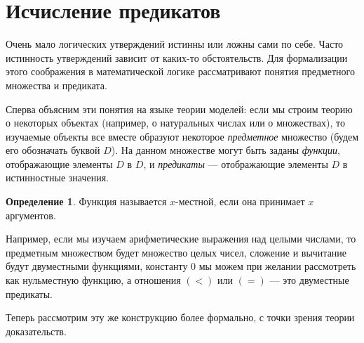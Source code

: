 \documentclass[12pt,a4paper,oneside]{article}
\begin{document}
\theoremstyle{definition}
\newtheorem{definition}{Определение}[section]
\newtheorem*{note}{Примечание}
\newtheorem*{example}{Пример}

\section{Исчисление предикатов}

Очень мало логических утверждений истинны или ложны сами по себе.
Часто истинность утверждений зависит от каких-то обстоятельств.
Для формализации этого соображения в математической логике рассматривают
понятия предметного множества и предиката.

Сперва объясним эти понятия на языке теории моделей:
если мы строим теорию о некоторых объектах (например, о натуральных 
числах или о множествах), то изучаемые объекты все вместе образуют 
некоторое \emph{предметное} множество (будем его обозначать буквой $D$). 
На данном множестве могут быть заданы \emph{функции}, отображающие элементы
$D$ в $D$, и \emph{предикаты} --- отображающие элементы $D$ в 
истинностные значения.

\begin{definition}
Функция называется $x$-местной, если она принимает $x$ аргументов.
\end{definition}

Например, если мы изучаем арифметические выражения над целыми числами, 
то предметным множеством будет множество целых чисел, сложение и 
вычитание будут двуместными функциями, константу $0$ мы можем при желании
рассмотреть как нульместную функцию, а отношения $(<)$ или $(=)$ ---
это двуместные предикаты.

Теперь рассмотрим эту же конструкцию более формально, с точки зрения теории 
доказательств.
\end{document}
